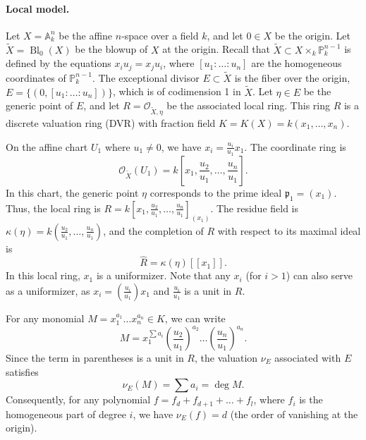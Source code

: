 
{\color{red}
\paragraph*{Local model.}
Let $X = \mathbb{A}_k^n$ be the affine $n$-space over a field $k$, and let $0 \in X$ be the origin.
Let $\widetilde{X} = \operatorname{Bl}_0(X)$ be the blowup of $X$ at the origin.
Recall that $\widetilde{X} \subset X \times_k \mathbb{P}^{n-1}_k$ is defined by the equations $x_i u_j = x_j u_i$, where $[u_1 : \dots : u_n]$ are the homogeneous coordinates of
$\mathbb{P}^{n-1}_k$.
The exceptional divisor $E \subset \widetilde{X}$ is the fiber over the origin, $E = \{ (0, [u_1 : \dots : u_n]) \}$, which is of codimension 1 in $\widetilde{X}$.
Let $\eta \in E$ be the generic point of $E$, and let $R = \mathcal{O}_{\widetilde{X}, \eta}$ be the associated local ring.
This ring $R$ is a discrete valuation ring (DVR) with fraction field $K = K(X) = k(x_1, \dots, x_n)$.

On the affine chart $U_1$ where $u_1 \neq 0$, we have $x_i = \frac{u_i}{u_1} x_1$.
The coordinate ring is
\[
\mathcal{O}_{\widetilde{X}}(U_1)
  =k\left[x_1, \frac{u_2}{u_1}, \dots, \frac{u_n}{u_1}\right].
\]
In this chart, the generic point $\eta$ corresponds to the prime ideal $\mathfrak{p}_1 = (x_1)$. Thus, the local ring is $R = k[x_1, \frac{u_2}{u_1}, \dots, \frac{u_n}{u_1}]_{(x_1)}$.
The residue field is $\kappa(\eta) = k(\frac{u_2}{u_1}, \dots, \frac{u_n}{u_1})$, and the completion of $R$ with respect to its maximal ideal is
\[
\widehat{R}=\kappa(\eta)[[x_1]].
\]
In this local ring, $x_1$ is a uniformizer. Note that any $x_i$ (for $i > 1$) can also serve as a uniformizer,
as $x_i = (\frac{u_i}{u_1}) x_1$ and $\frac{u_i}{u_1}$ is a unit in $R$.

For any monomial $M = x_1^{a_1} \dots x_n^{a_n} \in K$, we can write
\[
M = x_1^{\sum a_i} \left( \frac{u_2}{u_1} \right)^{a_2} \dots \left( \frac{u_n}{u_1} \right)^{a_n}.
\]
Since the term in parentheses is a unit in $R$, the valuation $\nu_E$ associated with $E$ satisfies
\[
\nu_E(M) = \sum a_i = \deg M.
\]
Consequently, for any polynomial $f = f_d + f_{d+1} + \dots + f_l$, where $f_i$ is the homogeneous part of degree $i$, we have $\nu_E(f) = d$ (the order of vanishing at the origin).
}
